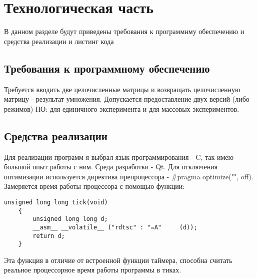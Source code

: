 \documentclass[a4paper, 14pt]{article}
\begin{document}
	\newpage
	\section{Технологическая часть}
	В данном разделе будут приведены требования к программнму обеспечению и средства реализации и листинг кода
	\subsection{Требования к программному обеспечению}
	 Требуется вводить две целочисленные матрицы и возвращать целочисленную матрицу - результат умножения. Допускается предоставление двух версий (либо режимов) ПО: для единичного эксперимента и для массовых экспериментов.
	\subsection{Средства реализации}
	Для реализации программ я выбрал язык программирования - C, так имею большой опыт работы с ним. Среда разработки - Qt. Для отключения оптимизации используется директива препроцессора - #pragma optimize("", off). Замеряется время работы процессора с помощью функции:\\
	\begin{lstlisting}[label=time,caption=Функция замера процессороного времени]
    unsigned long long tick(void)
    {
        unsigned long long d;
        __asm__ __volatile__ ("rdtsc" : "=A"     (d));
        return d;
    }
	\end{lstlisting}
	Эта функция в отличие от встроенной функции таймера, способна считать реальное процессорное время работы программы в тиках\cite{lom}.
\end{document}
